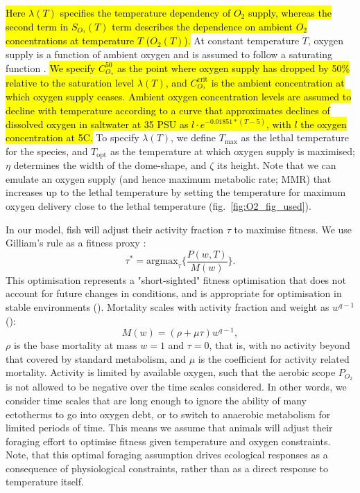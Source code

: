 \documentclass[11pt]{article}\usepackage[]{graphicx}\usepackage[]{color,soul}
\begin{document}
\hl{ Here $\lambda(T)$ specifies the temperature dependency of $O_2$ supply, whereas the second term in $S_{O_2}(T)$ term describes the dependence on ambient $O_2$ concentrations at temperature $T$ ($O_2(T)$).} At constant temperature $T$, oxygen supply is a function of ambient oxygen and is assumed to follow a saturating function \cite[e.g.,][]{lefrancois_influence_2003}. \hl{We specify $C_{O_2}^{\text{50}}$ as the point where oxygen supply has dropped by 50\% relative to the saturation level $\lambda(T)$, and $C_{O_2}^{\text{crit}}$ is the ambient concentration at which oxygen supply ceases. Ambient oxygen concentration levels are assumed to decline with temperature according to a curve that approximates declines of dissolved oxygen in saltwater at 35 PSU as $l\cdot e^{-0.01851*(T-5)}$, with $l$ the oxygen concentration at 5\degree C.} To specify $\lambda(T)$, we define $T_{\text{max}}$ as the lethal temperature for the species, and $T_{\text{opt}}$ as the temperature at which oxygen supply is maximised; $\eta$ determines the width of the dome-shape, and $\zeta$ its height. Note that we can emulate an oxygen supply (and hence maximum metabolic rate; MMR) that increases up to the lethal temperature by setting the temperature for maximum oxygen delivery close to the lethal temperature (fig.~\ref{fig:O2_fig_used}).

In our model, fish will adjust their activity fraction $\tau$ to maximise fitness. We use Gilliam's rule as a fitness proxy \citealt{gilliam_habitat_1987}:
\begin{equation}
  \tau^* = \text{argmax}_{\tau} \{ \frac{P(w,T)}{M(w)} \}.
\end{equation}
This optimisation represents a "short-sighted" fitness optimisation that does not account for future changes in conditions, and is appropriate for optimisation in stable environments (\citealt{sainmont_effective_2015}).  Mortality scales with activity fraction and weight as $w^{q-1}$ (\citealt{andersen_how_2009, hartvig_food_2011}):
\begin{equation}
  \label{eq:M}
  M(w) = (\rho+\mu\tau) w^{q-1},
\end{equation}
$\rho$ is the base mortality at mass $w=1$ and $\tau=0$, that is, with no activity beyond that covered by standard metabolism, and $\mu$ is the coefficient for activity related mortality.  Activity is limited by available oxygen, such that the aerobic scope $P_{O_2}$ is not allowed to be negative over the time scales considered. In other words, we consider time scales that are long enough to ignore the ability of many ectotherms to go into oxygen debt, or to switch to anaerobic metabolism for limited periods of time. This means we assume that animals will adjust their foraging effort to optimise fitness given temperature and oxygen constraints. Note, that this optimal foraging assumption drives ecological responses as a consequence of physiological constraints, rather than as a direct response to temperature itself.
\end{document}
